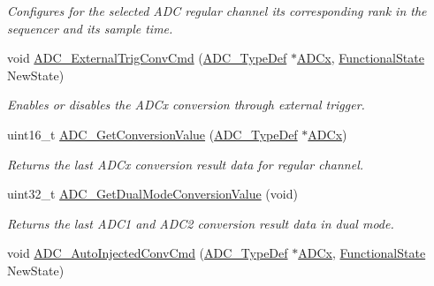 \begin{DoxyCompactItemize}
\begin{DoxyCompactList}\small\item\em Configures for the selected A\+DC regular channel its corresponding rank in the sequencer and its sample time. \end{DoxyCompactList}\item 
void \mbox{\hyperlink{group___a_d_c___private___functions_ga3ae92d7940a16c898223374a5857f509}{A\+D\+C\+\_\+\+External\+Trig\+Conv\+Cmd}} (\mbox{\hyperlink{struct_a_d_c___type_def}{A\+D\+C\+\_\+\+Type\+Def}} $\ast$\mbox{\hyperlink{group___s_t_m32_f1_x_x___n_u_c_l_e_o___l_o_w___l_e_v_e_l___exported___constants_gab44c1065d38c298955fc028346984340}{A\+D\+Cx}}, \mbox{\hyperlink{group___exported__types_gac9a7e9a35d2513ec15c3b537aaa4fba1}{Functional\+State}} New\+State)
\begin{DoxyCompactList}\small\item\em Enables or disables the A\+D\+Cx conversion through external trigger. \end{DoxyCompactList}\item 
uint16\+\_\+t \mbox{\hyperlink{group___a_d_c___private___functions_gaaf74221c285ec5dab5e66baf7bec6bd3}{A\+D\+C\+\_\+\+Get\+Conversion\+Value}} (\mbox{\hyperlink{struct_a_d_c___type_def}{A\+D\+C\+\_\+\+Type\+Def}} $\ast$\mbox{\hyperlink{group___s_t_m32_f1_x_x___n_u_c_l_e_o___l_o_w___l_e_v_e_l___exported___constants_gab44c1065d38c298955fc028346984340}{A\+D\+Cx}})
\begin{DoxyCompactList}\small\item\em Returns the last A\+D\+Cx conversion result data for regular channel. \end{DoxyCompactList}\item 
uint32\+\_\+t \mbox{\hyperlink{group___a_d_c___private___functions_gac5a4792dc29ef7ff6bfbce9f37e8a668}{A\+D\+C\+\_\+\+Get\+Dual\+Mode\+Conversion\+Value}} (void)
\begin{DoxyCompactList}\small\item\em Returns the last A\+D\+C1 and A\+D\+C2 conversion result data in dual mode. \end{DoxyCompactList}\item 
void \mbox{\hyperlink{group___a_d_c___private___functions_ga1ff9c3b8e4bbdd2addfd227f1a506a66}{A\+D\+C\+\_\+\+Auto\+Injected\+Conv\+Cmd}} (\mbox{\hyperlink{struct_a_d_c___type_def}{A\+D\+C\+\_\+\+Type\+Def}} $\ast$\mbox{\hyperlink{group___s_t_m32_f1_x_x___n_u_c_l_e_o___l_o_w___l_e_v_e_l___exported___constants_gab44c1065d38c298955fc028346984340}{A\+D\+Cx}}, \mbox{\hyperlink{group___exported__types_gac9a7e9a35d2513ec15c3b537aaa4fba1}{Functional\+State}} New\+State)

\end{DoxyCompactItemize}

